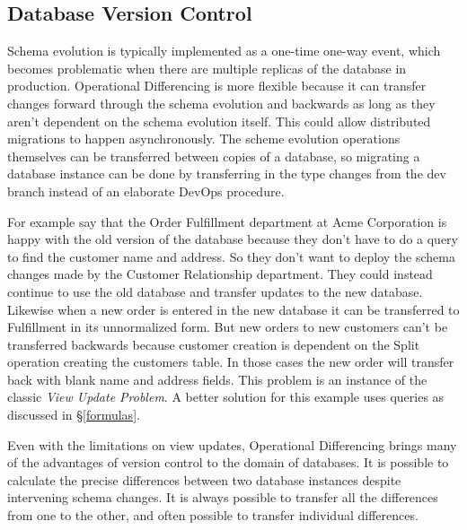 \documentclass[english,submission]{programming}
\theoremstyle{definition}
\begin{document}
\subsection{Database Version Control}\label{db-vc}

Schema evolution is typically implemented as a one-time one-way event, which becomes problematic when there are multiple replicas of the database in production. Operational Differencing is more flexible because it can transfer changes forward through the schema evolution and backwards as long as they aren't dependent on the schema evolution itself. This could allow distributed migrations to happen asynchronously.
The scheme evolution operations themselves can be transferred between copies of a database, so migrating a database instance can be done by transferring in the type changes from the dev branch instead of an elaborate DevOps procedure.

For example say that the Order Fulfillment department at Acme Corporation is happy with the old version of the database because they don't have to do a query to find the customer name and address. So they don't want to deploy the schema changes made by the Customer Relationship department. They could instead continue to use the old database and transfer updates to the new database. Likewise when a new order is entered in the new database it can be transferred to Fulfillment in its unnormalized form. But new orders to new customers can't be transferred backwards because customer creation is dependent on the \textsf{Split} operation creating the customers table. In those cases the new order will transfer back with blank name and address fields. This problem is an instance of the classic \textit{View Update Problem}\cite{Bancilhon81, Foster2007}. A better solution for this example uses queries as discussed in \S\ref{formulas}.

Even with the limitations on view updates, Operational Differencing brings many of the advantages of version control to the domain of databases. It is possible to calculate the precise differences between two database instances despite intervening schema changes. It is always possible to transfer all the differences from one to the other, and often possible to transfer individual differences.
\end{document}
